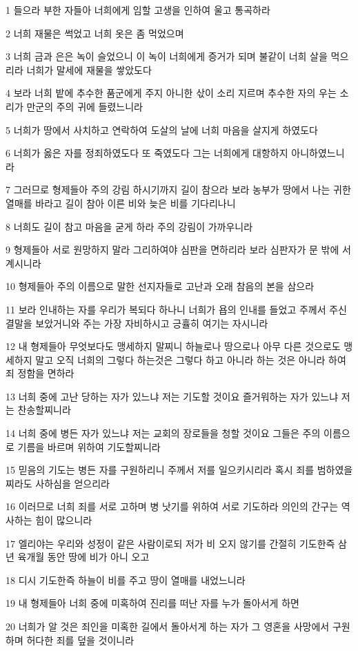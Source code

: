 \par 1 들으라 부한 자들아 너희에게 임할 고생을 인하여 울고 통곡하라
\par 2 너희 재물은 썩었고 너희 옷은 좀 먹었으며
\par 3 너희 금과 은은 녹이 슬었으니 이 녹이 너희에게 증거가 되며 불같이 너희 살을 먹으리라 너희가 말세에 재물을 쌓았도다
\par 4 보라 너희 밭에 추수한 품군에게 주지 아니한 삯이 소리 지르며 추수한 자의 우는 소리가 만군의 주의 귀에 들렸느니라
\par 5 너희가 땅에서 사치하고 연락하여 도살의 날에 너희 마음을 살지게 하였도다
\par 6 너희가 옳은 자를 정죄하였도다 또 죽였도다 그는 너희에게 대항하지 아니하였느니라
\par 7 그러므로 형제들아 주의 강림 하시기까지 길이 참으라 보라 농부가 땅에서 나는 귀한 열매를 바라고 길이 참아 이른 비와 늦은 비를 기다리나니
\par 8 너희도 길이 참고 마음을 굳게 하라 주의 강림이 가까우니라
\par 9 형제들아 서로 원망하지 말라 그리하여야 심판을 면하리라 보라 심판자가 문 밖에 서 계시니라
\par 10 형제들아 주의 이름으로 말한 선지자들로 고난과 오래 참음의 본을 삼으라
\par 11 보라 인내하는 자를 우리가 복되다 하나니 너희가 욥의 인내를 들었고 주께서 주신 결말을 보았거니와 주는 가장 자비하시고 긍휼히 여기는 자시니라
\par 12 내 형제들아 무엇보다도 맹세하지 말찌니 하늘로나 땅으로나 아무 다른 것으로도 맹세하지 말고 오직 너희의 그렇다 하는것은 그렇다 하고 아니라 하는 것은 아니라 하여 죄 정함을 면하라
\par 13 너희 중에 고난 당하는 자가 있느냐 저는 기도할 것이요 즐거워하는 자가 있느냐 저는 찬송할찌니라
\par 14 너희 중에 병든 자가 있느냐 저는 교회의 장로들을 청할 것이요 그들은 주의 이름으로 기름을 바르며 위하여 기도할찌니라
\par 15 믿음의 기도는 병든 자를 구원하리니 주께서 저를 일으키시리라 혹시 죄를 범하였을찌라도 사하심을 얻으리라
\par 16 이러므로 너희 죄를 서로 고하며 병 낫기를 위하여 서로 기도하라 의인의 간구는 역사하는 힘이 많으니라
\par 17 엘리야는 우리와 성정이 같은 사람이로되 저가 비 오지 않기를 간절히 기도한즉 삼년 육개월 동안 땅에 비가 아니 오고
\par 18 디시 기도한즉 하늘이 비를 주고 땅이 열매를 내었느니라
\par 19 내 형제들아 너희 중에 미혹하여 진리를 떠난 자를 누가 돌아서게 하면
\par 20 너희가 알 것은 죄인을 미혹한 길에서 돌아서게 하는 자가 그 영혼을 사망에서 구원하며 허다한 죄를 덮을 것이니라


